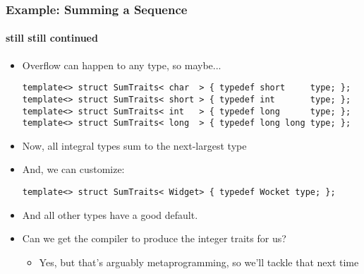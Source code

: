 \begin{frame}[fragile,t]
\frametitle{Example: Summing a Sequence}
\framesubtitle{still still continued}
\begin{itemize}[<+->]
\item Overflow can happen to any type, so maybe...
{\scriptsize\begin{verbatim}
template<> struct SumTraits< char  > { typedef short     type; };
template<> struct SumTraits< short > { typedef int       type; };
template<> struct SumTraits< int   > { typedef long      type; };
template<> struct SumTraits< long  > { typedef long long type; };
\end{verbatim}
}
\item Now, all integral types sum to the next-largest type
\item And, we can customize:
{\scriptsize\begin{verbatim}
template<> struct SumTraits< Widget> { typedef Wocket type; };
\end{verbatim}
}
\item And all other types have a good default.

\item Can we get the compiler to produce the integer traits for us?
  \begin{itemize}
    \item Yes, but that's arguably metaprogramming, so we'll tackle
      that next time
  \end{itemize}
\end{itemize}
\vskip 12pt
\pause
\begin{center}
\end{center}

\end{frame}


